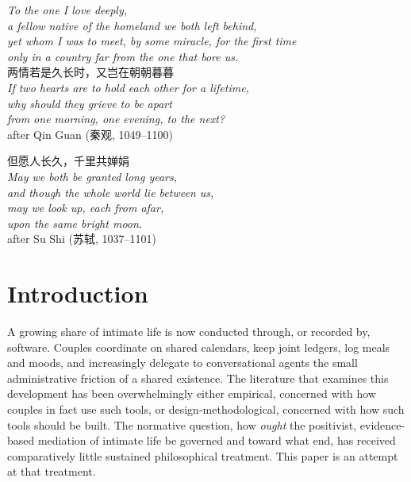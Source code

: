 \thispagestyle{empty}
\null\vfill
\begin{center}
{\itshape\color{ink}
To the one I love deeply,\\[0.4em]
a fellow native of the homeland we both left behind,\\[0.25em]
yet whom I was to meet, by some miracle, for the first time\\[0.25em]
only in a country far from the one that bore us.\\}
\vspace{2.6em}
{\cjkfont\large\color{rosedeep} 两情若是久长时，又岂在朝朝暮暮}\\[0.8em]
{\itshape\small\color{rosedeep}
If two hearts are to hold each other for a lifetime,\\[0.18em]
why should they grieve to be apart\\[0.18em]
from one morning, one evening, to the next?}\\[1.0em]
{\footnotesize\color{lightgold}after Qin Guan (\cjkfont 秦观\/{\normalfont,} 1049--1100)}
\vspace{2.4em}

{\cjkfont\large\color{rosedeep} 但愿人长久，千里共婵娟}\\[0.8em]
{\itshape\small\color{rosedeep}
May we both be granted long years,\\[0.18em]
and though the whole world lie between us,\\[0.18em]
may we look up, each from afar,\\[0.18em]
upon the same bright moon.}\\[1.0em]
{\footnotesize\color{lightgold}after Su Shi (\cjkfont 苏轼\/{\normalfont,} 1037--1101)}
\end{center}
\vfill\null
\clearpage

\section{Introduction}\label{p01:sec:intro}

A growing share of intimate life is now conducted through, or recorded by, software. Couples coordinate on shared calendars, keep joint ledgers, log meals and moods, and increasingly delegate to conversational agents the small administrative friction of a shared existence. The literature that examines this development has been overwhelmingly either empirical, concerned with how couples in fact use such tools, or design-methodological, concerned with how such tools should be built. The normative question, how \emph{ought} the positivist, evidence-based mediation of intimate life be governed and toward what end, has received comparatively little sustained philosophical treatment. This paper is an attempt at that treatment.

